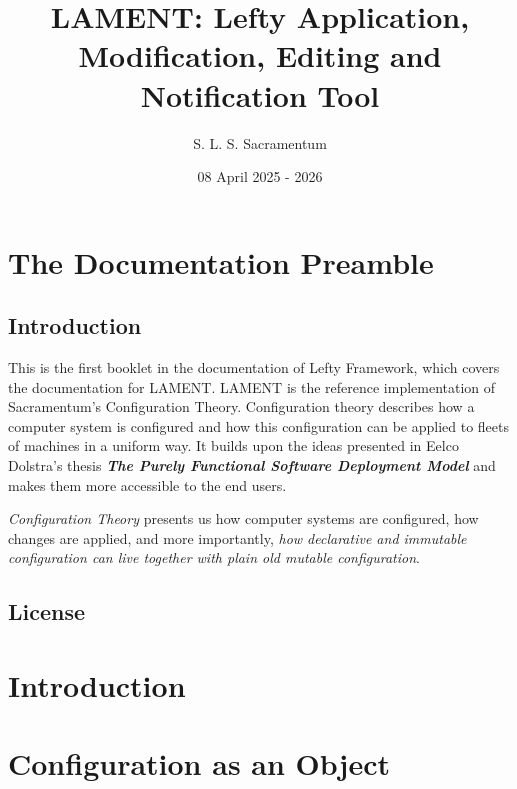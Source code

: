\documentclass{book}
\title{LAMENT: Lefty Application, Modification, Editing and Notification Tool}
\author{S. L. S. Sacramentum}
\date{08 April 2025 - 2026}
\begin{document}
    \maketitle
    \tableofcontents
    \chapter{The Documentation Preamble}
    \section{Introduction}
    This is the first booklet in the documentation of Lefty Framework, which covers the documentation for LAMENT.
    LAMENT is the reference implementation of Sacramentum's Configuration Theory. Configuration theory describes
    how a computer system is configured and how this configuration can be applied to fleets of machines in a
    uniform way. It builds upon the ideas presented in Eelco Dolstra's thesis \textbf{\textit{The Purely Functional Software Deployment Model}} and
    makes them more accessible to the end users.

    \textit{Configuration Theory} presents us how computer systems are configured, how changes are applied, and more importantly,
    \textit{how declarative and immutable configuration can live together with plain old mutable configuration}.
    \newpage
    \section{License}
    \newpage
    
    \newpage
    
    \newpage
    \chapter{Introduction}
    
    \chapter{Configuration as an Object}
    
\end{document}
